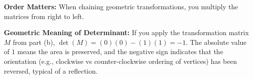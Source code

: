 \begin{takeaways}
\item \textbf{Order Matters:} When chaining geometric transformations, you multiply the matrices from right to left.
\item \textbf{Geometric Meaning of Determinant:} If you apply the transformation matrix $M$ from part (b), $\det(M) = (0)(0) - (1)(1) = -1$. The absolute value of $1$ means the area is preserved, and the negative sign indicates that the orientation (e.g., clockwise vs counter-clockwise ordering of vertices) has been reversed, typical of a reflection.
\end{takeaways}
